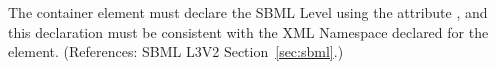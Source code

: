 The  container element must declare the SBML Level
using the attribute , and this declaration must be
consistent with the XML Namespace declared for the 
element.  (References: SBML L3V2 Section~\ref{sec:sbml}.)
